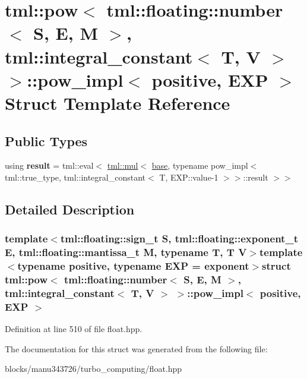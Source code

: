 \hypertarget{structtml_1_1pow_3_01tml_1_1floating_1_1number_3_01_s_00_01_e_00_01_m_01_4_00_01tml_1_1integral_bb3bb188be847782d25c365342089b4b}{\section{tml\+:\+:pow$<$ tml\+:\+:floating\+:\+:number$<$ S, E, M $>$, tml\+:\+:integral\+\_\+constant$<$ T, V $>$ $>$\+:\+:pow\+\_\+impl$<$ positive, E\+X\+P $>$ Struct Template Reference}
\label{structtml_1_1pow_3_01tml_1_1floating_1_1number_3_01_s_00_01_e_00_01_m_01_4_00_01tml_1_1integral_bb3bb188be847782d25c365342089b4b}
}
\subsection*{Public Types}
\begin{DoxyCompactItemize}
\item 
\hypertarget{structtml_1_1pow_3_01tml_1_1floating_1_1number_3_01_s_00_01_e_00_01_m_01_4_00_01tml_1_1integral_bb3bb188be847782d25c365342089b4b_a57bcd9df83ad8a39ecd02eca8454f8de}{using {\bfseries result} = tml\+::eval$<$ \hyperlink{structtml_1_1mul}{tml\+::mul}$<$ \hyperlink{structtml_1_1floating_1_1number}{base}, typename pow\+\_\+impl$<$ tml\+::true\+\_\+type, tml\+::integral\+\_\+constant$<$ T, E\+X\+P\+::value-\/1 $>$$>$\+::result $>$$>$}\label{structtml_1_1pow_3_01tml_1_1floating_1_1number_3_01_s_00_01_e_00_01_m_01_4_00_01tml_1_1integral_bb3bb188be847782d25c365342089b4b_a57bcd9df83ad8a39ecd02eca8454f8de}

\end{DoxyCompactItemize}


\subsection{Detailed Description}
\subsubsection*{template$<$tml\+::floating\+::sign\+\_\+t S, tml\+::floating\+::exponent\+\_\+t E, tml\+::floating\+::mantissa\+\_\+t M, typename T, T V$>$template$<$typename positive, typename E\+X\+P = exponent$>$struct tml\+::pow$<$ tml\+::floating\+::number$<$ S, E, M $>$, tml\+::integral\+\_\+constant$<$ T, V $>$ $>$\+::pow\+\_\+impl$<$ positive, E\+X\+P $>$}



Definition at line 510 of file float.\+hpp.



The documentation for this struct was generated from the following file\+:\begin{DoxyCompactItemize}
\item 
blocks/manu343726/turbo\+\_\+computing/float.\+hpp\end{DoxyCompactItemize}
